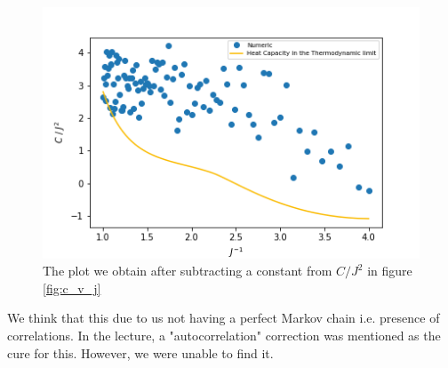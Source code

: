 \documentclass{cernatsnote}
\begin{document}
\begin{figure}[H]
    \centering
    \includegraphics[scale = 0.7]{images/c_v_j_corr.png}
    \caption{The plot we obtain after subtracting a constant from $C/J^{2}$ in figure \ref{fig:c_v_j}}
    \label{fig:correction}
\end{figure}
We think that this due to us not having a perfect Markov chain i.e. presence of correlations. In the lecture, a "autocorrelation" correction was mentioned as the cure for this. However, we were unable to find it.


\end{document}
